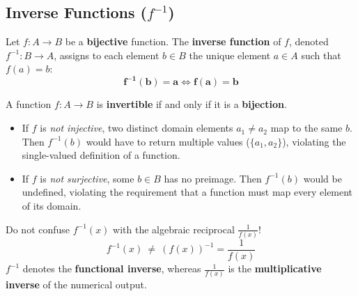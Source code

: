 \documentclass[11pt,a4paper]{article}
\begin{document}
\subsection{Inverse Functions (\texorpdfstring{$f^{-1}$}{f\textasciicircum-1})}

\begin{defbox}
Let $f: A \to B$ be a \textbf{bijective} function. The \textbf{inverse function} of $f$, denoted $f^{-1}: B \to A$, assigns to each element $b \in B$ the unique element $a \in A$ such that $f(a) = b$:
\[
\mathbf{f^{-1}(b) = a \iff f(a) = b}
\]
\end{defbox}

\begin{theorembox}
A function $f: A \to B$ is \textbf{invertible} if and only if it is a \textbf{bijection}.
\begin{itemize}
    \item If $f$ is \textit{not injective}, two distinct domain elements $a_1 \neq a_2$ map to the same $b$. Then $f^{-1}(b)$ would have to return multiple values ($\{a_1, a_2\}$), violating the single-valued definition of a function.
    \item If $f$ is \textit{not surjective}, some $b \in B$ has no preimage. Then $f^{-1}(b)$ would be undefined, violating the requirement that a function must map every element of its domain.
\end{itemize}
\end{theorembox}

\begin{warningbox}
Do not confuse $f^{-1}(x)$ with the algebraic reciprocal $\frac{1}{f(x)}$!
\[
f^{-1}(x) \ \neq \ (f(x))^{-1} = \frac{1}{f(x)}
\]
$f^{-1}$ denotes the \textbf{functional inverse}, whereas $\frac{1}{f(x)}$ is the \textbf{multiplicative inverse} of the numerical output.
\end{warningbox}
\end{document}

